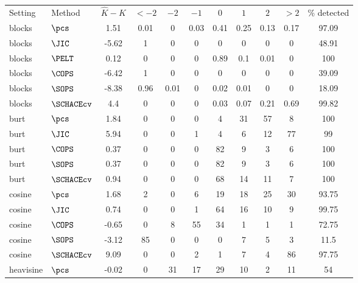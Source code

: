 \begin{table}[ht]
\centering
\begin{tabular}{llccccccccc}
 Setting & Method & $\hat{K} - K$ & $< -2$ & $-2$ & $-1$ & $0$ & $1$ & $2$ & $> 2$ & \% detected \\ 
 blocks & $\pcs$ &  1.51 &  0.01 &     0 &  0.03 &  0.41 &  0.25 &  0.13 &  0.17 & 97.09 \\ 
  blocks & $\JIC$ & -5.62 &     1 &     0 &     0 &     0 &     0 &     0 &     0 & 48.91 \\ 
  blocks & $\PELT$ &  0.12 &     0 &     0 &     0 &  0.89 &   0.1 &  0.01 &     0 &   100 \\ 
  blocks & $\COPS$ & -6.42 &     1 &     0 &     0 &     0 &     0 &     0 &     0 & 39.09 \\ 
   \hline
blocks & $\SOPS$ & -8.38 &  0.96 &  0.01 &     0 &  0.02 &  0.01 &     0 &     0 & 18.09 \\ 
  blocks & $\SCHACEcv$ &   4.4 &     0 &     0 &     0 &  0.03 &  0.07 &  0.21 &  0.69 & 99.82 \\ 
   \hline
burt & $\pcs$ &  1.84 &     0 &     0 &     0 &     4 &    31 &    57 &     8 &   100 \\ 
  burt & $\JIC$ &  5.94 &     0 &     0 &     1 &     4 &     6 &    12 &    77 &    99 \\ 
   \hline
burt & $\COPS$ &  0.37 &     0 &     0 &     0 &    82 &     9 &     3 &     6 &   100 \\ 
  burt & $\SOPS$ &  0.37 &     0 &     0 &     0 &    82 &     9 &     3 &     6 &   100 \\ 
  burt & $\SCHACEcv$ &  0.94 &     0 &     0 &     0 &    68 &    14 &    11 &     7 &   100 \\ 
  cosine & $\pcs$ &  1.68 &     2 &     0 &     6 &    19 &    18 &    25 &    30 & 93.75 \\ 
  cosine & $\JIC$ &  0.74 &     0 &     0 &     1 &    64 &    16 &    10 &     9 & 99.75 \\ 
  cosine & $\COPS$ & -0.65 &     0 &     8 &    55 &    34 &     1 &     1 &     1 & 72.75 \\ 
  cosine & $\SOPS$ & -3.12 &    85 &     0 &     0 &     0 &     7 &     5 &     3 &  11.5 \\ 
  cosine & $\SCHACEcv$ &  9.09 &     0 &     0 &     2 &     1 &     7 &     4 &    86 & 97.75 \\ 
  heavisine & $\pcs$ & -0.02 &     0 &    31 &    17 &    29 &    10 &     2 &    11 &    54 \\ 

\end{tabular}
\end{table}
